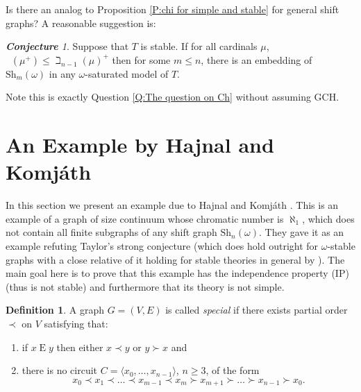 \documentclass[a4paper]{amsart}
\theoremstyle{plain}
\theoremstyle{definition}
\newtheorem{definition}[theorem]{Definition}
\theoremstyle{remark}
\newtheorem{conjecture}[theorem]{\textbf{Conjecture}}
\numberwithin{equation}{section}
\newcommand{\Sh}{\text{Sh}}
\newcommand{\E}{\mathrel{E}}
\DeclareMathOperator{\ch}{ch_T}
\begin{document}
%	 
%	 
%
Is there an analog to Proposition \ref{P:chi for simple and stable} for general shift graphs? A reasonable suggestion is:
\begin{conjecture}
  Suppose that $T$ is stable. If for all cardinals $\mu$, $\ch(\mu^+) \leq \beth_{n-1}(\mu)^+$ then for some $m\leq n$, there is an embedding of $\Sh_{m}(\omega)$ in any $\omega$-saturated model of $T$.
\end{conjecture}
Note this is exactly Question \ref{Q:The question on Ch} without assuming GCH.

\appendix
\section{An Example by Hajnal and Komj\'{a}th} \label{A:Hajnal-Komjath example}

In this section we present an example due to Hajnal and Komj\'{a}th \cite[Theorem 4]{HK}. This is an example of a graph of size continuum whose chromatic number is $\aleph_1$, which does not contain all finite subgraphs of any shift graph $\Sh_n(\omega)$. They gave it as an example refuting Taylor's strong conjecture (which does hold outright for $\omega$-stable graphs with a close relative of it holding for stable theories in general by \cite{1196,1211}). The main goal here is to prove that this example has the independence property (IP) (thus is not stable) and furthermore that its theory is not simple.  


\begin{definition}\label{D:special}
  A graph $G=(V,E)$ is called \emph{special} if there exists partial order $\prec$ on $V$ satisfying that:
  \begin{enumerate}
    \item if $x\E y$ then either $x\prec y$ or $y\succ x$ and
    \item there is no circuit $C=\langle x_0,\dots,x_{n-1}\rangle$, $n\geq 3$, of the form \[x_0\prec x_1\prec \dots\prec x_{m-1}\prec x_m\succ x_{m+1}\succ \dots\succ x_{n-1}\succ x_0.\]
  \end{enumerate} 
\end{definition}
\end{document}
